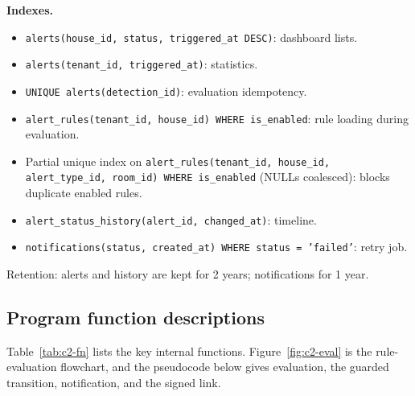 \textbf{Indexes.}
\begin{itemize}
\item \texttt{alerts(house\_id, status, triggered\_at DESC)}: dashboard lists.
\item \texttt{alerts(tenant\_id, triggered\_at)}: statistics.
\item \texttt{UNIQUE alerts(detection\_id)}: evaluation idempotency.
\item \texttt{alert\_rules(tenant\_id, house\_id) WHERE is\_enabled}: rule loading during evaluation.
\item Partial unique index on \texttt{alert\_rules(tenant\_id, house\_id, alert\_type\_id, room\_id) WHERE is\_enabled} (NULLs coalesced): blocks duplicate enabled rules.
\item \texttt{alert\_status\_history(alert\_id, changed\_at)}: timeline.
\item \texttt{notifications(status, created\_at) WHERE status = 'failed'}: retry job.
\end{itemize}
Retention: alerts and history are kept for 2 years; notifications for 1 year.


\subsection{Program function descriptions}
Table~\ref{tab:c2-fn} lists the key internal functions. Figure~\ref{fig:c2-eval} is the rule-evaluation
flowchart, and the pseudocode below gives evaluation, the guarded transition, notification, and the signed link.

